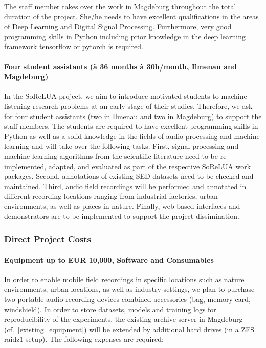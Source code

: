\documentclass[11pt]{article}
\begin{document}
The staff member takes over the work in Magdeburg throughout the total duration of the project. 
She/he needs to have excellent qualifications in the areas of Deep Learning and Digital Signal Processing. 
Furthermore, very good programming skills in Python including prior knowledge in the deep learning framework tensorflow or pytorch is required.


\paragraph{Four student assistants (à 36 months à 30h/month, Ilmenau and Magdeburg)}

In the SoReLUA project, we aim to introduce motivated students to machine listening research problems at an early stage of their studies.
Therefore, we ask for four student assistants (two in Ilmenau and two in Magdeburg) to support the staff members. The students are required to have excellent programming skills in Python as well as a solid knowledge in the fields of audio processing and machine learning and will take over the following tasks.
First, signal processing and machine learning algorithms from the scientific literature need to be re-implemented, adapted, and evaluated as part of the respective SoReLUA work packages. 
Second, annotations of existing SED datasets need to be checked and maintained. 
Third, audio field recordings will be performed and annotated in different recording locations ranging from industrial factories, urban environments, as well as places in nature.
Finally, web-based interfaces and demonstrators are to be implemented to support the project dissimination.


\subsubsection{Direct Project Costs}

\paragraph{Equipment up to EUR 10,000, Software and Consumables}
In order to enable mobile field recordings in specific locations such as nature environments, urban locations, as well as industry settings, we plan to purchase two portable audio recording devices combined accessories (bag, memory card, windshield).
In order to store datasets, models and training logs for reproducibility of the experiments, the existing archive server in Magdeburg (cf.~\ref{existing_equipment}) will be extended by additional hard drives (in a ZFS raidz1 setup).
The following expenses are required:
\end{document}
